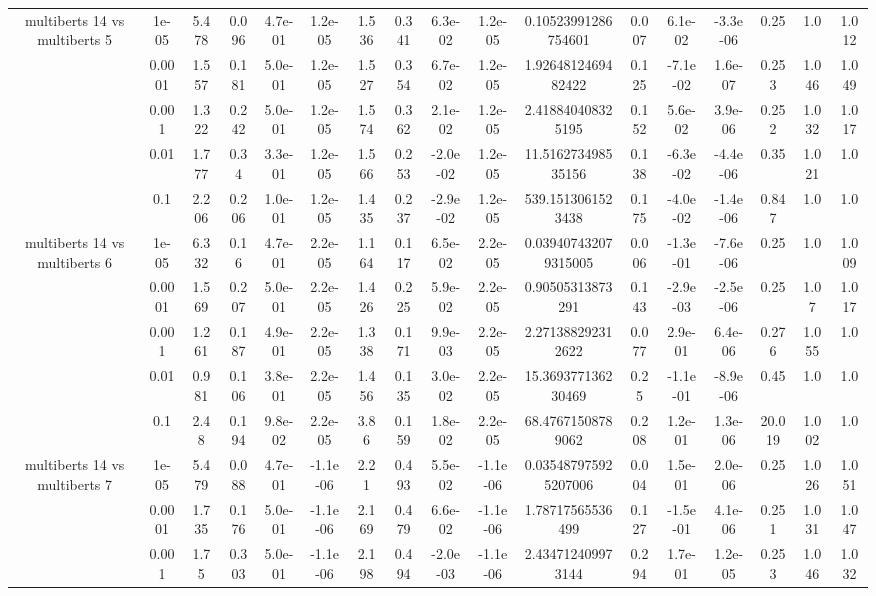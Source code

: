 \begin{tabular}{|c|c|c|c|c|c|c|c|c|c|c|c|c|c|c|c|c|}
\hline
\multirow{5}{*}{multiberts 14 vs multiberts 5} & 1e-05 & 5.478 & 0.096 & 4.7e-01 & 1.2e-05 & 1.536 & 0.341 & 6.3e-02 & 1.2e-05 & 0.10523991286754601 & 0.007 & 6.1e-02 & -3.3e-06 & 0.25 & 1.0 & 1.012 \\
 & 0.0001 & 1.557 & 0.181 & 5.0e-01 & 1.2e-05 & 1.527 & 0.354 & 6.7e-02 & 1.2e-05 & 1.9264812469482422 & 0.125 & -7.1e-02 & 1.6e-07 & 0.253 & 1.046 & 1.049 \\
 & 0.001 & 1.322 & 0.242 & 5.0e-01 & 1.2e-05 & 1.574 & 0.362 & 2.1e-02 & 1.2e-05 & 2.418840408325195 & 0.152 & 5.6e-02 & 3.9e-06 & 0.252 & 1.032 & 1.017 \\
 & 0.01 & 1.777 & 0.34 & 3.3e-01 & 1.2e-05 & 1.566 & 0.253 & -2.0e-02 & 1.2e-05 & 11.516273498535156 & 0.138 & -6.3e-02 & -4.4e-06 & 0.35 & 1.021 & 1.0 \\
 & 0.1 & 2.206 & 0.206 & 1.0e-01 & 1.2e-05 & 1.435 & 0.237 & -2.9e-02 & 1.2e-05 & 539.1513061523438 & 0.175 & -4.0e-02 & -1.4e-06 & 0.847 & 1.0 & 1.0 \\
\hline
\multirow{5}{*}{multiberts 14 vs multiberts 6} & 1e-05 & 6.332 & 0.16 & 4.7e-01 & 2.2e-05 & 1.164 & 0.117 & 6.5e-02 & 2.2e-05 & 0.039407432079315005 & 0.006 & -1.3e-01 & -7.6e-06 & 0.25 & 1.0 & 1.009 \\
 & 0.0001 & 1.569 & 0.207 & 5.0e-01 & 2.2e-05 & 1.426 & 0.225 & 5.9e-02 & 2.2e-05 & 0.90505313873291 & 0.143 & -2.9e-03 & -2.5e-06 & 0.25 & 1.07 & 1.017 \\
 & 0.001 & 1.261 & 0.187 & 4.9e-01 & 2.2e-05 & 1.338 & 0.171 & 9.9e-03 & 2.2e-05 & 2.271388292312622 & 0.077 & 2.9e-01 & 6.4e-06 & 0.276 & 1.055 & 1.0 \\
 & 0.01 & 0.981 & 0.106 & 3.8e-01 & 2.2e-05 & 1.456 & 0.135 & 3.0e-02 & 2.2e-05 & 15.369377136230469 & 0.25 & -1.1e-01 & -8.9e-06 & 0.45 & 1.0 & 1.0 \\
 & 0.1 & 2.48 & 0.194 & 9.8e-02 & 2.2e-05 & 3.86 & 0.159 & 1.8e-02 & 2.2e-05 & 68.47671508789062 & 0.208 & 1.2e-01 & 1.3e-06 & 20.019 & 1.002 & 1.0 \\
\hline
\multirow{5}{*}{multiberts 14 vs multiberts 7} & 1e-05 & 5.479 & 0.088 & 4.7e-01 & -1.1e-06 & 2.21 & 0.493 & 5.5e-02 & -1.1e-06 & 0.035487975925207006 & 0.004 & 1.5e-01 & 2.0e-06 & 0.25 & 1.026 & 1.051 \\
 & 0.0001 & 1.735 & 0.176 & 5.0e-01 & -1.1e-06 & 2.169 & 0.479 & 6.6e-02 & -1.1e-06 & 1.78717565536499 & 0.127 & -1.5e-01 & 4.1e-06 & 0.251 & 1.031 & 1.047 \\
 & 0.001 & 1.75 & 0.303 & 5.0e-01 & -1.1e-06 & 2.198 & 0.494 & -2.0e-03 & -1.1e-06 & 2.434712409973144 & 0.294 & 1.7e-01 & 1.2e-05 & 0.253 & 1.046 & 1.032 \\

\end{tabular}
